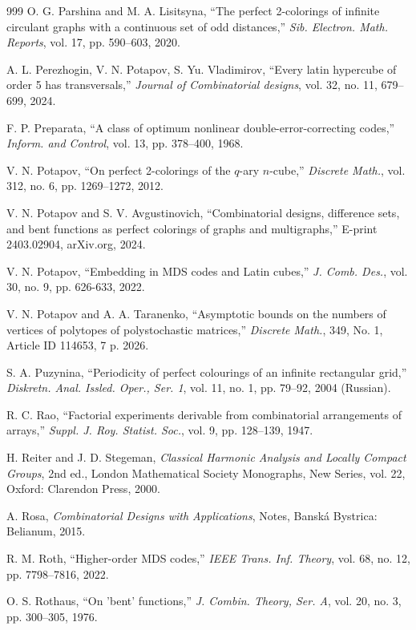 \documentclass[11pt]{article}
\theoremstyle{definition}
\begin{document}
{{{\begin{thebibliography}{999}
O. G. Parshina and M. A. Lisitsyna,
``The perfect 2-colorings of infinite circulant graphs with a continuous set of odd distances,''
\textit{Sib. Electron. Math. Reports}, vol. 17, pp. 590--603, 2020.

A. L. Perezhogin, V. N. Potapov, S. Yu. Vladimirov, ``Every latin hypercube of order 5 has transversals,'' \textit{Journal of Combinatorial designs},  vol. 32, no. 11, 679–699,  2024.


F. P. Preparata,
``A class of optimum nonlinear double-error-correcting codes,''
\textit{Inform. and Control}, vol. 13, pp. 378--400, 1968.

V. N. Potapov,
``On perfect 2-colorings of the $q$-ary $n$-cube,''
\textit{Discrete Math.}, vol. 312, no. 6, pp. 1269--1272, 2012.

V. N. Potapov and S. V. Avgustinovich,
``Combinatorial designs, difference sets, and bent functions as perfect colorings of graphs and multigraphs,''
E-print 2403.02904, arXiv.org, 2024.

V. N. Potapov,
``Embedding in MDS codes and Latin cubes,''
\textit{J. Comb. Des.}, vol.  30, no. 9, pp. 626-633, 2022.

V. N. Potapov and A. A. Taranenko, 
``Asymptotic bounds on the numbers of vertices of polytopes of polystochastic matrices,''
\textit{Discrete Math.},  349, No. 1, Article ID 114653, 7 p. 2026.

S. A. Puzynina,
``Periodicity of perfect colourings of an infinite rectangular grid,''
\textit{Diskretn. Anal. Issled. Oper., Ser. 1}, vol. 11, no. 1, pp. 79--92, 2004 (Russian).

R. C. Rao,
``Factorial experiments derivable from combinatorial arrangements of arrays,''
\textit{Suppl. J. Roy. Statist. Soc.}, vol. 9, pp. 128--139, 1947.

H. Reiter and J. D. Stegeman,
\textit{Classical Harmonic Analysis and Locally Compact Groups}, 2nd ed.,
London Mathematical Society Monographs, New Series, vol. 22,
Oxford: Clarendon Press, 2000.

A. Rosa,
\textit{Combinatorial Designs with Applications},
Notes, Banská Bystrica: Belianum, 2015.

R. M. Roth,
``Higher-order MDS codes,''
\textit{IEEE Trans. Inf. Theory}, vol. 68, no. 12, pp. 7798--7816, 2022.

O. S. Rothaus,
``On 'bent' functions,''
\textit{J. Combin. Theory, Ser. A}, vol. 20, no. 3, pp. 300--305, 1976.


\end{thebibliography}}}}
\end{document}
